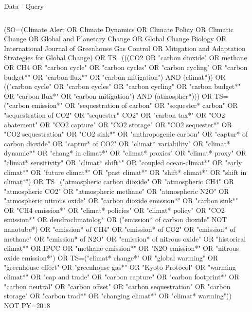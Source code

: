 \documentclass[9pt]{beamer}
\begin{document}

\begin{frame}{Data - Query}
\begin{columns}
	\begin{column}{0.65\linewidth}
		\tiny
		(SO=(Climate Alert OR Climate Dynamics OR Climate Policy OR Climatic Change OR Global and Planetary Change OR Global Change Biology OR International Journal of Greenhouse Gas Control OR Mitigation and Adaptation Strategies for Global Change) OR TS=(((CO2 OR "carbon dioxide" OR methane OR CH4 OR "carbon cycle" OR "carbon cycles" OR "carbon cycling" OR "carbon budget*" OR "carbon flux*" OR "carbon mitigation") AND (climat*)) OR (("carbon cycle" OR "carbon cycles" OR "carbon cycling" OR "carbon budget*" OR "carbon flux*" OR "carbon mitigation") AND (atmospher*))) OR TS=("carbon emission*" OR "sequestration of carbon" OR "sequester* carbon" OR "sequestration of CO2" OR "sequester* CO2" OR "carbon tax*" OR "CO2 abatement" OR "CO2 capture" OR "CO2 storage" OR "CO2 sequester*" OR "CO2 sequestration" OR "CO2 sink*" OR "anthropogenic carbon" OR "captur* of carbon dioxide" OR "captur* of CO2" OR "climat* variability" OR "climat* dynamic*" OR "chang* in climat*" OR "climat* proxies" OR "climat* proxy" OR "climat* sensitivity" OR "climat* shift*" OR "coupled ocean-climat*" OR "early climat*" OR "future climat*" OR "past climat*" OR "shift* climat*" OR "shift in climat*") OR TS=("atmospheric carbon dioxide" OR "atmospheric CH4" OR "atmospheric CO2" OR "atmospheric methane" OR "atmospheric N2O" OR "atmospheric nitrous oxide" OR "carbon dioxide emission*" OR "carbon sink*" OR "CH4 emission*" OR "climat* policies" OR "climat* policy" OR "CO2 emission*" OR dendroclimatolog* OR ("emission* of carbon dioxide" NOT nanotube*) OR "emission* of CH4" OR "emission* of CO2" OR "emission* of methane" OR "emission* of N2O" OR "emission* of nitrous oxide" OR "historical climat*" OR IPCC OR "methane emission*" OR "N2O emission*" OR "nitrous oxide emission*") OR TS=("climat* change*" OR "global warming" OR "greenhouse effect" OR "greenhouse gas*" OR "Kyoto Protocol" OR "warming climat*" OR "cap and trade" OR "carbon capture" OR "carbon footprint*" OR "carbon neutral" OR "carbon offset" OR "carbon sequestration" OR "carbon storage" OR "carbon trad*" OR "changing climat*" OR "climat* warming")) NOT PY=2018
		

\end{column}
\end{columns}
\end{frame}
\end{document}
